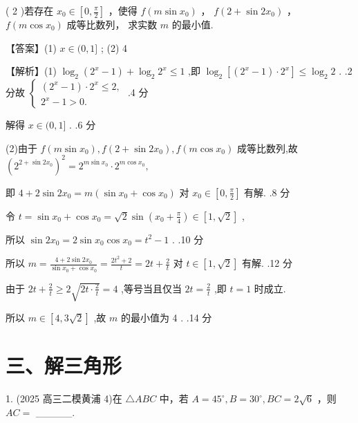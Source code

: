 \documentclass[10pt]{article}
\begin{document}
( 2 )若存在 \({x}_{0} \in  \left\lbrack  {0,\frac{\pi }{2}}\right\rbrack\) ，使得 \(f\left( {m\sin {x}_{0}}\right)\) ， \(f\left( {2 + \sin {2{x}_{0}}}\right)\) ， \(f\left( {m\cos {x}_{0}}\right)\) 成等比数列， 求实数 \(m\) 的最小值.

【答案】(1) \(x \in  (0,1\rbrack\) ; (2) 4

【解析】(1) \({\log }_{2}\left( {{2}^{x} - 1}\right)  + {\log }_{2}{2}^{x} \leq  1\) ,即 \({\log }_{2}\left\lbrack  {\left( {{2}^{x} - 1}\right)  \cdot  {2}^{x}}\right\rbrack   \leq  {\log }_{2}2\) . .2 分故 \(\left\{  \begin{array}{l} \left( {{2}^{x} - 1}\right)  \cdot  {2}^{x} \leq  2, \\  {2}^{x} - 1 > 0. \end{array}\right.\) .4 分

解得 \(x \in  (0,1\rbrack\) . .6 分

(2)由于 \(f\left( {m\sin {x}_{0}}\right) ,f\left( {2 + \sin 2{x}_{0}}\right) ,f\left( {m\cos {x}_{0}}\right)\) 成等比数列,故 \({\left( {2}^{2 + \sin 2{x}_{0}}\right) }^{2} = {2}^{m\sin {x}_{0}} \cdot  {2}^{m\cos {x}_{0}},\)

即 \(4 + 2\sin 2{x}_{0} = m\left( {\sin {x}_{0} + \cos {x}_{0}}\right)\) 对 \({x}_{0} \in  \left\lbrack  {0,\frac{\pi }{2}}\right\rbrack\) 有解. .8 分

令 \(t = \sin {x}_{0} + \cos {x}_{0} = \sqrt{2}\sin \left( {{x}_{0} + \frac{\pi }{4}}\right)  \in  \left\lbrack  {1,\sqrt{2}}\right\rbrack\) ,

所以 \(\sin 2{x}_{0} = 2\sin {x}_{0}\cos {x}_{0} = {t}^{2} - 1\) . .10 分

所以 \(m = \frac{4 + 2\sin 2{x}_{0}}{\sin {x}_{0} + \cos {x}_{0}} = \frac{2{t}^{2} + 2}{t} = {2t} + \frac{2}{t}\) 对 \(t \in  \left\lbrack  {1,\sqrt{2}}\right\rbrack\) 有解. .12 分

由于 \({2t} + \frac{2}{t} \geq  2\sqrt{{2t} \cdot  \frac{2}{t}} = 4\) ,等号当且仅当 \({2t} = \frac{2}{t}\) ,即 \(t = 1\) 时成立.

所以 \(m \in  \left\lbrack  {4,3\sqrt{2}}\right\rbrack\) ,故 \(m\) 的最小值为 4 . .14 分

\section*{三、解三角形}

1. (2025 高三二模黄浦 4)在 \(\bigtriangleup {ABC}\) 中，若 \(A = {45}^{ \circ  },B = {30}^{ \circ  },{BC} = 2\sqrt{6}\) ，则 \({AC} =\) \_\_\_\_\_.
\end{document}
